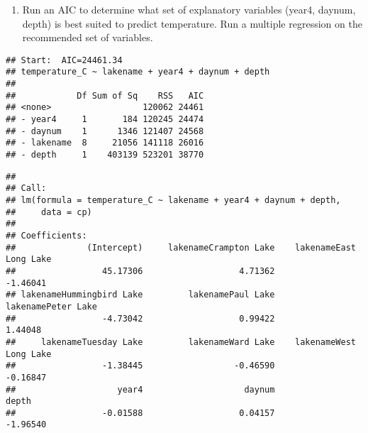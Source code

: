 \documentclass[
]{article}
\newenvironment{Shaded}{\begin{snugshade}}{\end{snugshade}}
\newcommand{\CommentTok}[1]{\textcolor[rgb]{0.56,0.35,0.01}{\textit{#1}}}
\newcommand{\DataTypeTok}[1]{\textcolor[rgb]{0.13,0.29,0.53}{#1}}
\newcommand{\DecValTok}[1]{\textcolor[rgb]{0.00,0.00,0.81}{#1}}
\newcommand{\KeywordTok}[1]{\textcolor[rgb]{0.13,0.29,0.53}{\textbf{#1}}}
\newcommand{\NormalTok}[1]{#1}
\newcommand{\OperatorTok}[1]{\textcolor[rgb]{0.81,0.36,0.00}{\textbf{#1}}}
\newcommand{\StringTok}[1]{\textcolor[rgb]{0.31,0.60,0.02}{#1}}
\providecommand{\tightlist}{%
  \setlength{\itemsep}{0pt}\setlength{\parskip}{0pt}}
\begin{document}
\begin{enumerate}
\def\labelenumi{\arabic{enumi}.}
\setcounter{enumi}{3}
\tightlist
\item
  Run an AIC to determine what set of explanatory variables (year4,
  daynum, depth) is best suited to predict temperature. Run a multiple
  regression on the recommended set of variables.
\end{enumerate}

\begin{Shaded}
\end{Shaded}

\begin{verbatim}
## Start:  AIC=24461.34
## temperature_C ~ lakename + year4 + daynum + depth
## 
##            Df Sum of Sq    RSS   AIC
## <none>                  120062 24461
## - year4     1       184 120245 24474
## - daynum    1      1346 121407 24568
## - lakename  8     21056 141118 26016
## - depth     1    403139 523201 38770
\end{verbatim}

\begin{verbatim}
## 
## Call:
## lm(formula = temperature_C ~ lakename + year4 + daynum + depth, 
##     data = cp)
## 
## Coefficients:
##              (Intercept)     lakenameCrampton Lake    lakenameEast Long Lake  
##                 45.17306                   4.71362                  -1.46041  
## lakenameHummingbird Lake         lakenamePaul Lake        lakenamePeter Lake  
##                 -4.73042                   0.99422                   1.44048  
##     lakenameTuesday Lake         lakenameWard Lake    lakenameWest Long Lake  
##                 -1.38445                  -0.46590                  -0.16847  
##                    year4                    daynum                     depth  
##                 -0.01588                   0.04157                  -1.96540
\end{verbatim}
\end{document}
